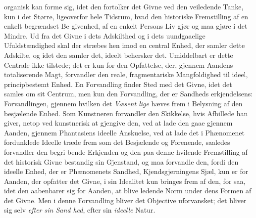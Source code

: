 organisk kan forme sig, idet den fortolker det Givne ved den
veiledende Tanke, kun i det Større, ligeoverfor hele Tidsrum,
hvad den historiske Fremstilling af en enkelt begrændset Be\-%
givenhed, af en enkelt Persons Liv gjør og maa gjøre i det
Mindre. Ud fra det Givne i dets Adskilthed og i dets
uundgaaelige Ufuldstændighed skal der stræbes hen imod en
central Enhed, der samler dette Adskilte, og idet den
samler det, ideelt behersker det. Umiddelbart er dette
Centrale ikke tilstede; det er kun for den Opfattelse, der,
gjennem Aandens totaliserende Magt, forvandler den reale,
fragmentariske Mangfoldighed til ideel, principbestemt Enhed.
En Forvandling finder Sted med det Givne, idet det samles
om sit Centrum, men kun den Forvandling, der er Sandheds\-%
erkjendelsens: Forvandlingen, gjennem hvilken det \emph{Væsent\-%
lige} hæves frem i Belysning af den besjælende Enhed. Som
Kunstneren forvandler den Skikkelse, hvis Afbillede han giver,
netop ved kunstnerisk at gjengive den, ved at lade den gaae
gjennem Aanden, gjennem Phantasiens ideelle Anskuelse, ved
at lade det i Phænomenet fordunklede Ideelle træde frem som
det Besjælende og Forenende, saaledes forvandler den begri\-%
bende Erkjenden og den paa denne hvilende Fremstilling af
det historisk Givne bestandig sin Gjenstand, og maa forvandle
den, fordi den ideelle Enhed, der er Phænomenets Sandhed,
Kjendsgjerningens Sjæl, kun er for Aanden, der opfatter det
Givne, i sin Idealitet kun bringes frem af den, for saa, idet
den aabenbarer sig for Aanden, at blive ledende Norm under
dens Formen af det Givne. Men i denne Forvandling bliver
det Objective uforvansket; det bliver sig selv \emph{efter sin Sand\-%
hed}, efter sin \emph{ideelle} Natur.

